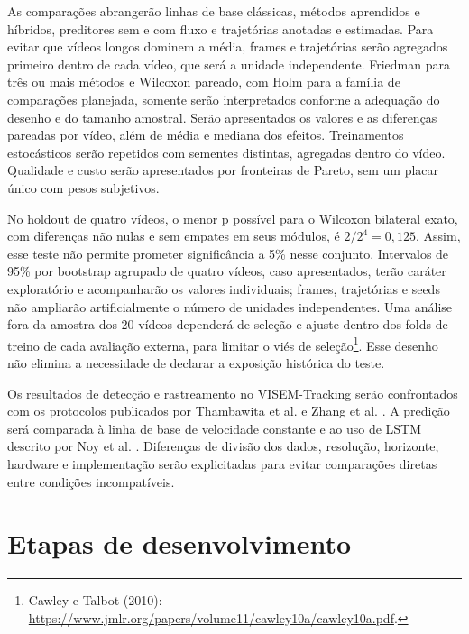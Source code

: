 As comparações abrangerão linhas de base clássicas, métodos aprendidos e híbridos, preditores sem e com fluxo e trajetórias anotadas e estimadas. Para evitar que vídeos longos dominem a média, frames e trajetórias serão agregados primeiro dentro de cada vídeo, que será a unidade independente. Friedman para três ou mais métodos e Wilcoxon pareado, com Holm para a família de comparações planejada, somente serão interpretados conforme a adequação do desenho e do tamanho amostral. Serão apresentados os valores e as diferenças pareadas por vídeo, além de média e mediana dos efeitos. Treinamentos estocásticos serão repetidos com sementes distintas, agregadas dentro do vídeo. Qualidade e custo serão apresentados por fronteiras de Pareto, sem um placar único com pesos subjetivos.

No holdout de quatro vídeos, o menor p possível para o Wilcoxon bilateral exato, com diferenças não nulas e sem empates em seus módulos, é $2/2^4=0{,}125$. Assim, esse teste não permite prometer significância a 5\% nesse conjunto. Intervalos de 95\% por bootstrap agrupado de quatro vídeos, caso apresentados, terão caráter exploratório e acompanharão os valores individuais; frames, trajetórias e seeds não ampliarão artificialmente o número de unidades independentes. Uma análise fora da amostra dos 20 vídeos dependerá de seleção e ajuste dentro dos folds de treino de cada avaliação externa, para limitar o viés de seleção\footnote{Cawley e Talbot (2010): \url{https://www.jmlr.org/papers/volume11/cawley10a/cawley10a.pdf}.}. Esse desenho não elimina a necessidade de declarar a exposição histórica do teste.

Os resultados de detecção e rastreamento no VISEM-Tracking serão confrontados com os protocolos publicados por Thambawita et al. \cite{thambawita2023visemtracking} e Zhang et al. \cite{zhang2024spermyolo}. A predição será comparada à linha de base de velocidade constante e ao uso de LSTM descrito por Noy et al. \cite{noy2023location}. Diferenças de divisão dos dados, resolução, horizonte, hardware e implementação serão explicitadas para evitar comparações diretas entre condições incompatíveis.

\section{Etapas de desenvolvimento}

